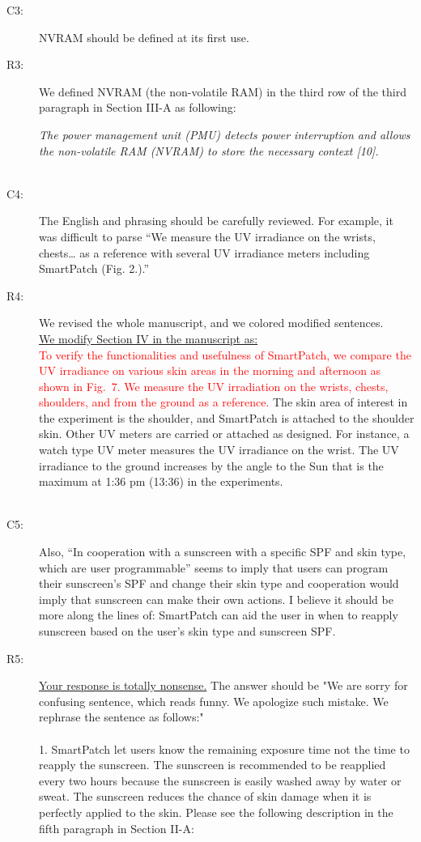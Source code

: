 \documentclass[onecolumn]{IEEEconf}
\begin{document}
\begin{description}
\item [C3: ] NVRAM should be defined at its first use.
\item [R3: ] We defined NVRAM (the non-volatile RAM) in the third row of the third paragraph in Section III-A as following:

\textit{The power management unit (PMU) detects power interruption and allows the non-volatile RAM (NVRAM) to store the necessary context [10].}\\
~\\

\item [C4:] The English and phrasing should be carefully reviewed. For example, it was difficult to parse ``We measure the UV irradiance on the wrists, chests… as a reference with several UV irradiance meters including SmartPatch (Fig. 2.).'' 

\item [R4: ] We revised the whole manuscript, and we colored modified sentences. \\

\underline{We modify Section IV in the manuscript as:}\\
\textcolor{red}{To verify the functionalities and usefulness of SmartPatch, we compare the UV irradiance on various skin areas in the morning and afternoon as shown in Fig.~7. We measure the UV irradiation on the wrists, chests, shoulders, and from the ground as a reference.} The skin area of interest in the experiment is the shoulder, and SmartPatch is attached to the shoulder skin. Other UV meters are carried or attached as designed. For instance, a watch type UV meter measures the UV irradiance on the wrist. The UV irradiance to the ground increases by the angle to the Sun that is the maximum at 1:36 pm (13:36) in the experiments.\\
~\\


\item [C5:] Also, ``In cooperation with a sunscreen with a specific SPF and skin type, which are user programmable'' seems to imply that users can program their sunscreen's SPF and change their skin type and cooperation would imply that sunscreen can make their own actions. I believe it should be more along the lines of: SmartPatch can aid the user in when to reapply sunscreen based on the user's skin type and sunscreen SPF.

\item [R5: ] \underline{Your response is totally nonsense.} The answer should be "We are sorry for confusing sentence, which reads funny. We apologize such mistake. We rephrase the sentence as follows:"\\ \\
1. SmartPatch let users know the remaining exposure time not the time to reapply the sunscreen. The sunscreen is recommended to be reapplied every two hours because the sunscreen is easily washed away by water or sweat. The sunscreen reduces the chance of skin damage when it is perfectly applied to the skin. Please see the following description in the fifth paragraph in Section II-A:\\


\end{description}
\end{document}
